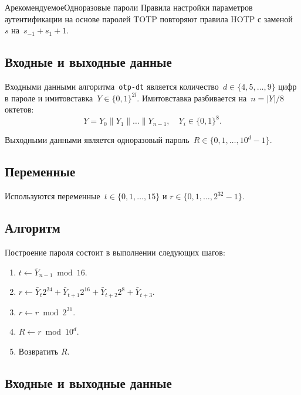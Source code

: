 \begin{appendix}{А}{рекомендуемое}{Одноразовые пароли}
Правила настройки параметров аутентификации на основе паролей 
TOTP повторяют правила HOTP с заменой~$s$ на~$s_{-1}+s_1+1$.

\label{OTP.DT}

\subsection{Входные и выходные данные}

Входными данными алгоритма~\texttt{otp-dt} является 
количество~$d\in\{4,5,\ldots,9\}$ цифр в пароле и 
имитовставка~$Y\in\{0,1\}^{2l}$. 
Имитовставка разбивается на~$n=|Y|/8$ октетов:
$$
Y=Y_0\parallel Y_1\parallel\ldots\parallel Y_{n-1},\quad
Y_i\in\{0,1\}^8.
$$

Выходными данными является одноразовый пароль~$R\in\{0,1,\ldots,10^d-1\}$.

\subsection{Переменные}

Используются переменные~$t\in\{0,1,\ldots,15\}$ и $r\in\{0,1,\ldots,2^{32}-1\}$.

\subsection{Алгоритм}

Построение пароля состоит в выполнении следующих шагов:
\begin{enumerate}
\item
$t\leftarrow \bar{Y}_{n-1}\bmod 16$.

\item
$r\leftarrow \bar{Y}_t 2^{24}+\bar{Y}_{t+1} 2^{16}+
\bar{Y}_{t+2}2^{8}+\bar{Y}_{t+3}$.

\item
$r\leftarrow r\bmod 2^{31}$.

\item
$R\leftarrow r\bmod 10^d$.

\item
Возвратить $R$.
\end{enumerate}

\label{OTP.HOTP}

\subsection{Входные и выходные данные}


\end{appendix}
